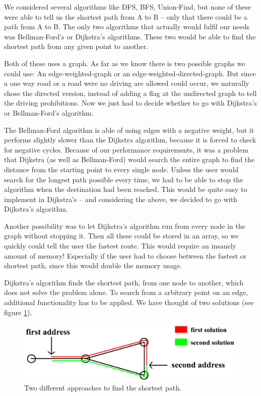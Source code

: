 \documentclass[a4paper,10pt,titlepage]{article}
\begin{document}
We considered several algorithms like DFS, BFS, Union-Find, but none of these were able to tell us the shortest path from A to B – only that there could be a path from A to B. The only two algorithms that actually would fulfil our needs was Bellman-Ford’s or Dijkstra’s algorithms. These two would be able to find the shortest path from any given point to another. 

Both of these uses a graph. As far as we know there is two possible graphs we could use: An edge-weighted-graph or an edge-weighted-directed-graph. But since a one way road or a road were no driving are allowed could occur, we naturally chose the directed version, instead of adding a flag at the undirected graph to tell the driving prohibitions. Now we just had to decide whether to go with Dijkstra’s or Bellman-Ford’s algorithm.

The Bellman-Ford algorithm is able of using edges with a negative weight, but it performs slightly slower than the  Dijkstra algorithm, because it is forced to check for negative cycles. Because of our performance requirements, it was a problem that Dijkstra (as well as Bellman-Ford) would search the entire graph to find the distance from the starting point to every single node. Unless the user would search for the longest path possible every time, we had to be able to stop the algorithm when the destination had been reached. This would be quite easy to implement in Dijkstra’s – and considering the above, we decided to go with Dijkstra’s algorithm.

Another possibility was to let Dijkstra’s algorithm run from every node in the graph without stopping it. Then all these could be stored in an array, so we quickly could tell the user the fastest route. This would require an insanely amount of memory! Especially if the user had to choose between the fastest or shortest path, since this would double the memory usage. 

Dijkstra's algorithm finds the shortest path, from one node to another, which does not solve the problem alone. To search from a arbitrary point on an edge, additional functionality has to be applied. We have thought of two solutions (see figure \ref{fig:routeFinding}). 

\begin{figure}[H]
\includegraphics[width=120mm]{routeFinding.png}
\caption{Two different approaches to find the shortest path.}
\label{fig:routeFinding}
\end{figure}
\end{document}
